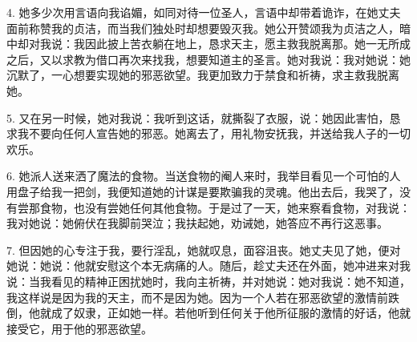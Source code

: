4. 她多少次用言语向我谄媚，如同对待一位圣人，言语中却带着诡诈，在她丈夫面前称赞我的贞洁，而当我们独处时却想要毁灭我。她公开赞颂我为贞洁之人，暗中却对我说：我因此披上苦衣躺在地上，恳求天主，愿主救我脱离那。她一无所成之后，又以求教为借口再次来找我，想要知道主的圣言。她对我说：我对她说：她沉默了，一心想要实现她的邪恶欲望。我更加致力于禁食和祈祷，求主救我脱离她。\par

5. 又在另一时候，她对我说：我听到这话，就撕裂了衣服，说：她因此害怕，恳求我不要向任何人宣告她的邪恶。她离去了，用礼物安抚我，并送给我人子的一切欢乐。\par

6. 她派人送来洒了魔法的食物。当送食物的阉人来时，我举目看见一个可怕的人用盘子给我一把剑，我便知道她的计谋是要欺骗我的灵魂。他出去后，我哭了，没有尝那食物，也没有尝她任何其他食物。于是过了一天，她来察看食物，对我说：我对她说：她俯伏在我脚前哭泣；我扶起她，劝诫她，她答应不再行这恶事。\par

7. 但因她的心专注于我，要行淫乱，她就叹息，面容沮丧。她丈夫见了她，便对她说：她说：他就安慰这个本无病痛的人。随后，趁丈夫还在外面，她冲进来对我说：当我看见的精神正困扰她时，我向主祈祷，并对她说：她对我说：她不知道，我这样说是因为我的天主，而不是因为她。因为一个人若在邪恶欲望的激情前跌倒，他就成了奴隶，正如她一样。若他听到任何关于他所征服的激情的好话，他就接受它，用于他的邪恶欲望。\par

